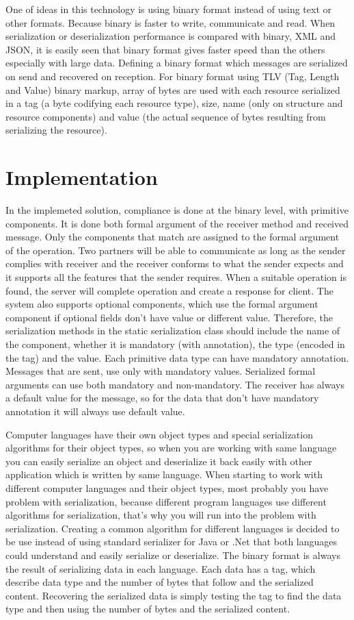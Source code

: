 \documentclass[runningheads,a4paper]{llncs}
\begin{document}
One of ideas in this technology is using binary format instead of using text or other formats. Because binary is faster to write, communicate and read. When serialization or deserialization performance is compared with binary, XML and JSON, it is easily seen that binary format gives faster speed than the others especially with large data\cite{binaryOnline}.
Defining a binary format which messages are serialized on send and recovered on reception. For binary format using TLV (Tag, Length and Value) binary markup\cite{asn1}, array of bytes are used with each resource serialized in a tag (a byte codifying each resource type), size, name (only on structure and resource components) and value (the actual sequence of bytes resulting from serializing the resource).
\section{Implementation}
In the implemeted solution, compliance is done at the binary level, with primitive components. It is done both formal argument of the receiver method and received message. Only the components that match are assigned to the formal argument of the operation. Two partners will be able to communicate as long as the sender complies with receiver and the receiver conforms to what the sender expects and it supports all the features that the sender requires. When a suitable operation is found, the server will complete operation and create a response for client. The system also supports optional components, which use the formal argument component if optional fields don’t have value or different value. Therefore, the serialization methods in the static serialization class should include the name of the component, whether it is mandatory (with annotation), the type (encoded in the tag) and the value. Each primitive data type can have mandatory annotation. Messages that are sent, use only with mandatory values. Serialized formal arguments can use both mandatory and non-mandatory. The receiver has always a default value for the message, so for the data that don’t have mandatory annotation it will always use default value.

Computer languages have their own object types and special serialization algorithms for their object types, so when you are working with same language you can easily serialize an object and deserialize it back easily with other application which is written by same language. When starting to work with different computer languages and their object types, most probably you have problem with serialization, because different program languages use different algorithms for serialization, that’s why you will run into the problem with serialization. Creating a common algorithm for different languages is decided to be use instead of using standard serializer for Java or .Net that both languages could understand and easily serialize or deserialize. The binary format is always the result of serializing data in each language. Each data has a tag, which describe data type and the number of bytes that follow and the serialized content. Recovering the serialized data is simply testing the tag to find the data type and then using the number of bytes and the serialized content.
\end{document}
